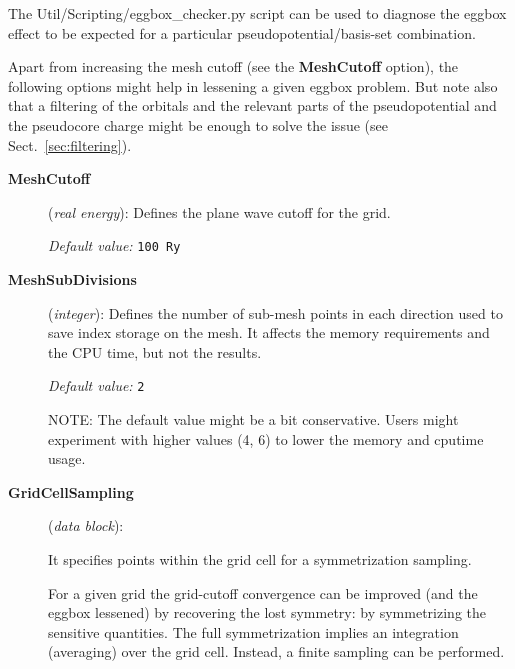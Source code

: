 \documentclass[11pt]{article}
\begin{document}
The Util/Scripting/eggbox\_checker.py script can be used to diagnose
the eggbox effect to be expected for a particular
pseudopotential/basis-set combination.

Apart from increasing the mesh cutoff (see the {\bf MeshCutoff} option),
the following options might help in lessening a given eggbox problem. But
note also that a filtering of the orbitals and the relevant parts of
the pseudopotential and the pseudocore charge might be enough to solve
the issue (see Sect.~\ref{sec:filtering}).

\begin{description}

\item[{\bf MeshCutoff}] ({\it real energy}):
Defines the plane wave cutoff for the grid.

 
{\it Default value:} {\tt 100 Ry}

\item[{\bf MeshSubDivisions}] ({\it integer}):
Defines the number of sub-mesh points in each direction used
to save index storage on the mesh. It affects the memory
requirements and the CPU time, but not the results. 

{\it Default value:} {\tt 2}

NOTE: The default value might be a bit conservative. Users might
experiment with higher values (4, 6) to lower the memory and cputime
usage.

\item[{\bf GridCellSampling}] ({\it data block}):

It specifies points within the grid cell for a symmetrization sampling.

For a given grid the grid-cutoff convergence can be improved (and the
eggbox lessened) by recovering the lost symmetry: by symmetrizing the
sensitive quantities. The full symmetrization implies an integration
(averaging) over the grid cell. Instead, a finite sampling can be
performed.


\end{description}
\end{document}
